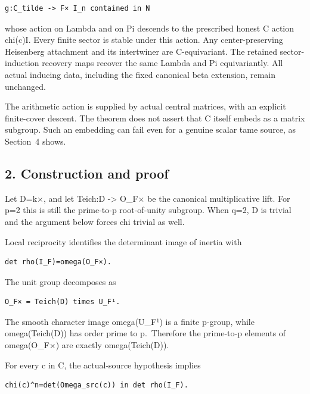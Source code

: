 \begin{Verbatim}[fontsize=\small,breaklines=true,breakanywhere=true]
g:C_tilde -> F× I_n contained in N
\end{Verbatim}

whose action on Lambda and on Pi descends to the prescribed honest C
action chi(c)I. Every finite sector is stable under this action. Any
center-preserving Heisenberg attachment and its intertwiner are
C-equivariant. The retained sector-induction recovery maps recover the
same Lambda and Pi equivariantly. All actual inducing data, including
the fixed canonical beta extension, remain unchanged.

The arithmetic action is supplied by actual central matrices, with an
explicit finite-cover descent. The theorem does not assert that C itself
embeds as a matrix subgroup. Such an embedding can fail even for a
genuine scalar tame source, as Section~4 shows.

\hypertarget{odd_scalar-construction-and-proof}{%
\subsection{2. Construction and proof}\label{odd_scalar-construction-and-proof}}

Let D=k×, and let Teich:D -\textgreater{} O\_F× be the canonical
multiplicative lift. For p=2 this is still the prime-to-p root-of-unity
subgroup. When q=2, D is trivial and the argument below forces chi
trivial as well.

Local reciprocity identifies the determinant image of inertia with

\begin{Verbatim}[fontsize=\small,breaklines=true,breakanywhere=true]
det rho(I_F)=omega(O_F×).
\end{Verbatim}

The unit group decomposes as

\begin{Verbatim}[fontsize=\small,breaklines=true,breakanywhere=true]
O_F× = Teich(D) times U_F¹.
\end{Verbatim}

The smooth character image omega(U\_F¹) is a finite p-group, while
omega(Teich(D)) has order prime to p.~Therefore the prime-to-p elements
of omega(O\_F×) are exactly omega(Teich(D)).

For every c in C, the actual-source hypothesis implies

\begin{Verbatim}[fontsize=\small,breaklines=true,breakanywhere=true]
chi(c)^n=det(Omega_src(c)) in det rho(I_F).
\end{Verbatim}

